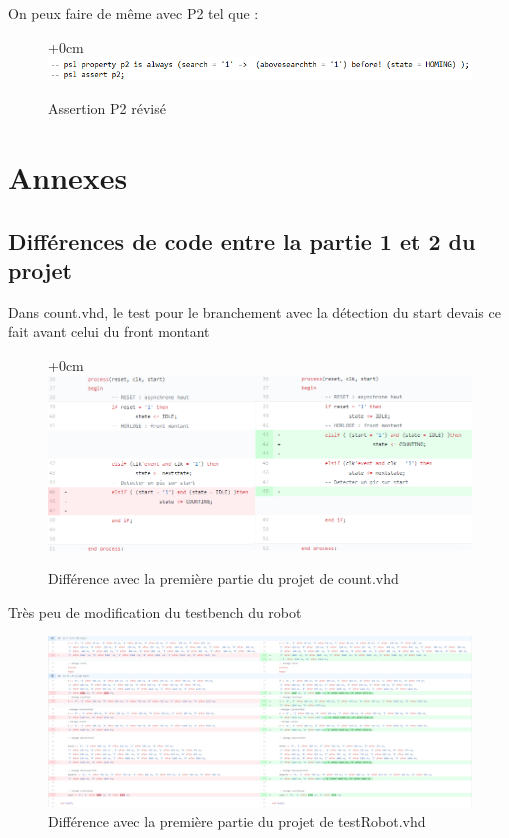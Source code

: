 \documentclass{article}
\begin{document}
On peux faire de même avec P2 tel que :

\begin{figure}[!h]
\advance\leftskip+0cm
\includegraphics[scale=0.6]{PSL/P2P.PNG}
\caption{Assertion P2 révisé }
\end{figure} 



\newpage
\section{Annexes}
\subsection{Différences de code entre la partie 1 et 2 du projet}

Dans count.vhd, le test pour le branchement avec la détection du start devais ce fait avant celui du front montant 
\begin{figure}[!h]
\advance\leftskip+0cm
\includegraphics[scale=0.6]{modifCount.PNG}
\caption{Différence avec la première partie du projet de count.vhd}
\end{figure} 

Très peu de modification du testbench du robot
\begin{figure}[!h]
\centering
\includegraphics[scale=0.5]{changeR.PNG}
\caption{Différence avec la première partie du projet de testRobot.vhd }
\end{figure}
\end{document}
